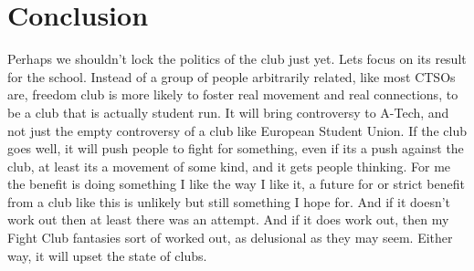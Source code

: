\documentclass{article}
\begin{document}
\section{Conclusion}
Perhaps we shouldn't lock the politics of the club just yet. Lets focus on its result for the school. Instead of a group of people arbitrarily related, like most CTSOs are, freedom club is more likely to foster real movement and real connections, to be a club that is actually student run. It will bring controversy to A-Tech, and not just the empty controversy of a club like European Student Union. If the club goes well, it will push people to fight for something, even if its a push against the club, at least its a movement of some kind, and it gets people thinking. For me the benefit is doing something I like the way I like it, a future for or strict benefit from a club like this is unlikely but still something I hope for. And if it doesn't work out then at least there was an attempt. And if it does work out, then my Fight Club fantasies sort of worked out, as delusional as they may seem. Either way, it will upset the state of clubs.
\end{document}
